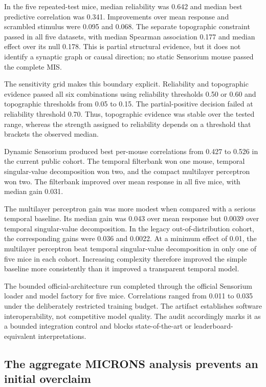 In the five repeated-test mice, median reliability was 0.642 and median best
predictive correlation was 0.341. Improvements over mean response and scrambled
stimulus were 0.095 and 0.068. The separate topographic constraint passed in all
five datasets, with median Spearman association 0.177 and median effect over its
null 0.178. This is partial structural evidence, but it does not identify a
synaptic graph or causal direction; no static Sensorium mouse passed the complete
MIS.

The sensitivity grid makes this boundary explicit. Reliability and topographic
evidence passed all six combinations using reliability thresholds 0.50 or 0.60
and topographic thresholds from 0.05 to 0.15. The partial-positive decision
failed at reliability threshold 0.70. Thus, topographic evidence was stable over
the tested range, whereas the strength assigned to reliability depends on a
threshold that brackets the observed median.

Dynamic Sensorium produced best per-mouse correlations from 0.427 to 0.526 in
the current public cohort. The temporal filterbank won one mouse, temporal
singular-value decomposition won two, and the compact multilayer perceptron won
two. The filterbank improved over mean response in all five mice, with median
gain 0.031.

The multilayer perceptron gain was more modest when compared with a serious
temporal baseline. Its median gain was 0.043 over mean response but 0.0039 over
temporal singular-value decomposition. In the legacy out-of-distribution
cohort, the corresponding gains were 0.036 and 0.0022. At a minimum effect of
0.01, the multilayer perceptron beat temporal singular-value decomposition in
only one of five mice in each cohort. Increasing complexity therefore improved
the simple baseline more consistently than it improved a transparent temporal
model.

The bounded official-architecture run completed through the official Sensorium
loader and model factory for five mice. Correlations ranged from 0.011 to 0.035
under the deliberately restricted training budget. The artifact establishes
software interoperability, not competitive model quality. The audit accordingly
marks it as a bounded integration control and blocks state-of-the-art or
leaderboard-equivalent interpretations.

\subsection{The aggregate MICRONS analysis prevents an initial overclaim}
\label{subsec:results-microns-aggregate}

